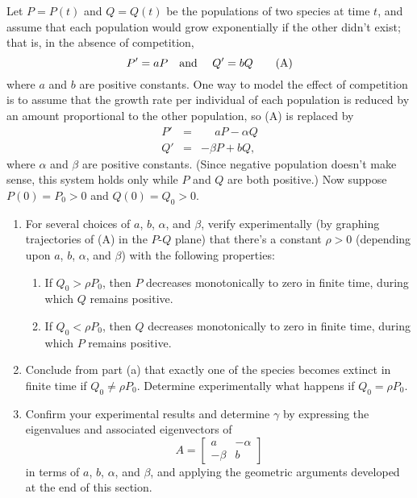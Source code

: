 \documentclass{ximera}
\begin{document}
\begin{problem}\label{exer:10.4.42} 
Let $P=P(t)$ and $Q=Q(t)$ be the populations of two species at time
$t$, and assume that each population would grow exponentially if the
other didn't exist; that is, in the absence of competition,
$$
P'=aP \mbox{\quad and \quad}Q'=bQ
\quad\quad \text{(A)}
$$
where $a$ and $b$ are positive constants. One way to model the effect
of competition is to assume that the growth rate per individual of
each population is reduced by an amount proportional to the other
population, so (A) is replaced by
\begin{eqnarray*}
P'&=&\phantom{-}aP-\alpha Q\\
Q'&=&-\beta P+bQ,
\end{eqnarray*}
where $\alpha$ and $\beta$ are positive constants. (Since negative
population doesn't make sense, this system holds only while $P$ and
$Q$ are both positive.) Now suppose $P(0)=P_0>0$ and
$Q(0)=Q_0>0$.

\begin{enumerate}
\item %
For several choices of $a$, $b$, $\alpha$, and $\beta$, verify
experimentally
(by graphing trajectories of (A) in the $P$-$Q$ plane) that there's a
constant $\rho>0$ (depending upon $a$, $b$, $\alpha$, and $\beta$) with the
following properties:
\begin{enumerate}
\item %
If $Q_0>\rho P_0$, then $P$ decreases monotonically to zero
in finite time, during which $Q$ remains positive.
\item %
If $Q_0<\rho P_0$, then $Q$ decreases monotonically to zero in
finite time, during which $P$ remains positive.
\end{enumerate}
\item %
Conclude from  part (a) that exactly one of the species
becomes extinct in finite time if $Q_0\ne\rho P_0$. Determine
experimentally what happens if $Q_0=\rho P_0$.
\item %
Confirm your experimental results and determine $\gamma$ by expressing
the eigenvalues and associated eigenvectors of
$$
A=\begin{bmatrix} a &-\alpha\\-\beta&b\end{bmatrix}
$$
in terms of $a$, $b$, $\alpha$, and $\beta$, and applying the geometric
arguments developed at the end of this section.
\end{enumerate}


\end{problem}
\end{document}
